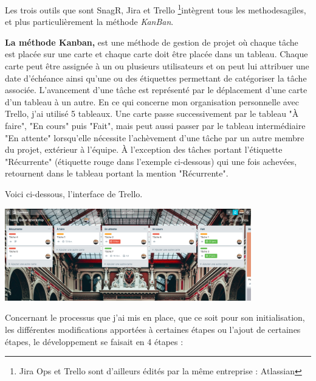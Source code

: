 Les trois outils que sont SnagR, Jira et Trello \footnote{Jira Ops et Trello sont d'ailleurs édités par la même entreprise : Atlassian}intègrent tous les \gls{methodesagiles}, et plus particulièrement la méthode \textit{KanBan}.

\textbf{La méthode Kanban,} est une méthode de gestion de projet où chaque tâche est placée sur une carte et chaque carte doit être placée dans un tableau. Chaque carte peut être assignée à un ou plusieurs utilisateurs et on peut lui attribuer une date d'échéance ainsi qu'une ou des étiquettes permettant de catégoriser la tâche associée. L'avancement d'une tâche est représenté par le déplacement d'une carte d'un tableau à un autre.
En ce qui concerne mon organisation personnelle avec Trello, j'ai utilisé 5 tableaux. Une carte passe successivement par le tableau "À faire", "En cours" puis "Fait", mais peut aussi passer par le tableau intermédiaire "En attente" lorsqu'elle nécessite l'achèvement d'une tâche par un autre membre du projet, extérieur à l'équipe. À l'exception des tâches portant l'étiquette "Récurrente" (étiquette rouge dans l'exemple ci-dessous) qui une fois achevées, retournent dans le tableau portant la mention "Récurrente".

Voici ci-dessous, l'interface de Trello.

\begin{center}
\includegraphics[height=4cm]{ressources/images/figures/Trello.png}
\end{center}

\newpage

Concernant le processus que j'ai mis en place, que ce soit pour son initialisation, les différentes modifications apportées à certaines étapes ou l'ajout de certaines étapes, le développement se faisait en 4 étapes :


